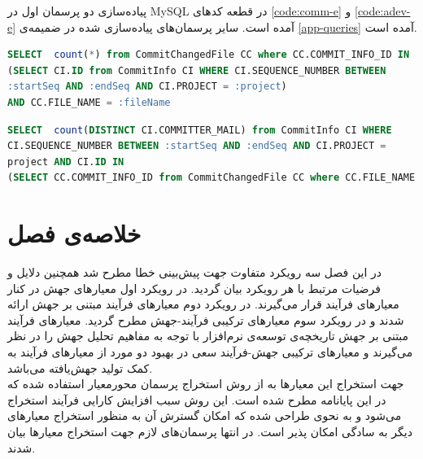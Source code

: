 پیاده‌سازی دو پرسمان اول در MySQL در قطعه‌ کد‌های  \ref{code:comm-e}  و \ref{code:adev-e} آمده است. سایر پرسمان‌های پیاده‌سازی شده در ضمیمه‌ی \ref{app-queries}  آمده است. 

\begin{latin}
\begin{lstlisting}[language=SQL]
SELECT  count(*) from CommitChangedFile CC where CC.COMMIT_INFO_ID IN
(SELECT CI.ID from CommitInfo CI WHERE CI.SEQUENCE_NUMBER BETWEEN 
:startSeq AND :endSeq AND CI.PROJECT = :project)
AND CC.FILE_NAME = :fileName
\end{lstlisting}
\end{latin}
\label{code:comm-e}

\begin{latin}
\begin{lstlisting}[language=SQL]
SELECT  count(DISTINCT CI.COMMITTER_MAIL) from CommitInfo CI WHERE
CI.SEQUENCE_NUMBER BETWEEN :startSeq AND :endSeq AND CI.PROJECT = 
project AND CI.ID IN 
(SELECT CC.COMMIT_INFO_ID from CommitChangedFile CC where CC.FILE_NAME = :fileName)
\end{lstlisting}
\end{latin}
\label{code:adev-e}

\section{خلاصه‌ی فصل}

در این فصل سه رویکرد متفاوت جهت پیش‌بینی خطا مطرح شد همچنین دلایل و فرضیات مرتبط با هر رویکرد بیان گردید. در رویکرد اول معیارهای جهش در کنار معیارهای فرآیند قرار می‌گیرند. در رویکرد دوم معیارهای فرآیند مبتنی بر جهش ارائه شدند و در رویکرد سوم معیارهای ترکیبی فرآیند-جهش مطرح گردید. معیارهای فرآیند مبتنی بر جهش تاریخچه‌ی توسعه‌ی نرم‌افزار با توجه به مفاهیم تحلیل جهش  را در نظر می‌گیرند و معیارهای ترکیبی جهش-فرآیند سعی در بهبود دو مورد از  معیارهای فرآیند به کمک تولید جهش‌یافته می‌باشد. \\
جهت استخراج این معیارها به از روش استخراج پرسمان محورمعیار استفاده شده که در این پایانامه مطرح شده است. این روش سبب افزایش کارایی فرآیند استخراج می‌شود و به نحوی طراحی شده که امکان گسترش آن به منظور استخراج معیارهای دیگر به سادگی امکان پذیر است. در انتها پرسمان‌های لازم جهت استخراج معیارها بیان شدند.






